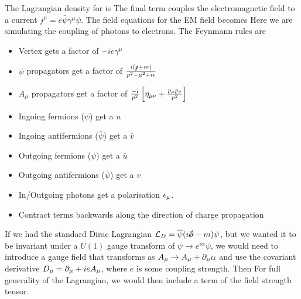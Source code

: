 \documentclass{article}
\begin{document}
\begin{definition}
The Lagrangian density for  is 
The final term couples the electromagnetic field to a current $j^\mu = e \bar{\psi} \gamma^\mu \psi$. The field equations for the EM field becomes 
Here we are simulating the coupling of photons to electrons. The Feynmann rules are 
\begin{itemize}
    \item Vertex gets a factor of $-ie\gamma^\mu$
    \item  $\psi$ propagators get a factor of $\frac{i(\slashed{p}+m)}{p^2 - \mu^2 + i\epsilon}$
    \item $A_\mu$ propagators get a factor of $\frac{-i}{p^2}\left[ \eta_{\mu\nu} + \frac{p_\mu p_\nu}{p^2} \right]$
    \item Ingoing fermions ($\psi$) get a $u$
    \item Ingoing antifermions ($\bar{\psi}$) get a $\bar{v}$
    \item Outgoing fermions ($\psi$) get a $\bar{u}$
    \item Outgoing antifermions ($\bar{\psi}$) get a $v$
    \item In/Outgoing photons get a polarisation $\epsilon_\mu$. 
    \item Contract terms backwards along the direction of charge propagation
\end{itemize}
\end{definition}

\begin{idea}
If we had the standard Dirac Lagrangian $\mc{L}_D = \bar{\psi}(i\slashed{\del}-m)\psi$, but we wanted it to be invariant under a $U(1)$ gauge transform of $\psi \to e^{i\alpha}\psi$, we would need to introduce a gauge field that transforms as $A_\mu \to A_\mu + \partial_\mu \alpha$ and use the covariant derivative $D_\mu = \partial_\mu + ieA_\mu$, where $e$ is some coupling strength. Then 
For full generality of the Lagrangian, we would then include a term of the field strength tensor. 
\end{idea}
\end{document}
